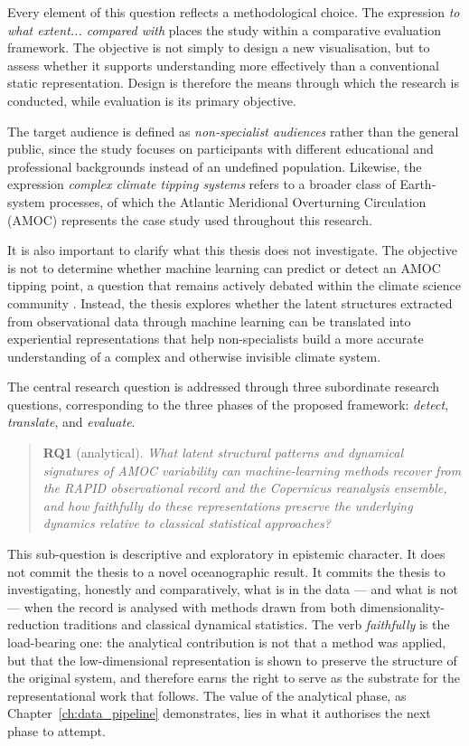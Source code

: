 Every element of this question reflects a methodological choice. The expression \emph{to what extent... compared with} places the study within a comparative evaluation framework. The objective is not simply to design a new visualisation, but to assess whether it supports understanding more effectively than a conventional static representation. Design is therefore the means through which the research is conducted, while evaluation is its primary objective.

The target audience is defined as \emph{non-specialist audiences} rather than the general public, since the study focuses on participants with different educational and professional backgrounds instead of an undefined population. Likewise, the expression \emph{complex climate tipping systems} refers to a broader class of Earth-system processes, of which the Atlantic Meridional Overturning Circulation (AMOC) represents the case study used throughout this research.

It is also important to clarify what this thesis does not investigate. The objective is not to determine whether machine learning can predict or detect an AMOC tipping point, a question that remains actively debated within the climate science community \citep{ditlevsen2023, benyami2024}. Instead, the thesis explores whether the latent structures extracted from observational data through machine learning can be translated into experiential representations that help non-specialists build a more accurate understanding of a complex and otherwise invisible climate system.

The central research question is addressed through three subordinate research questions, corresponding to the three phases of the proposed framework: \emph{detect}, \emph{translate}, and \emph{evaluate}.

\begin{quote}
\textbf{RQ1} (analytical). \emph{What latent structural patterns and dynamical signatures of AMOC variability can machine-learning methods recover from the RAPID observational record and the Copernicus reanalysis ensemble, and how faithfully do these representations preserve the underlying dynamics relative to classical statistical approaches?}
\end{quote}

This sub-question is descriptive and exploratory in epistemic character. It does not commit the thesis to a novel oceanographic result. It commits the thesis to investigating, honestly and comparatively, what is in the data --- and what is not --- when the record is analysed with methods drawn from both dimensionality-reduction traditions and classical dynamical statistics. The verb \emph{faithfully} is the load-bearing one: the analytical contribution is not that a method was applied, but that the low-dimensional representation is shown to preserve the structure of the original system, and therefore earns the right to serve as the substrate for the representational work that follows. The value of the analytical phase, as Chapter~\ref{ch:data_pipeline} demonstrates, lies in what it authorises the next phase to attempt.

